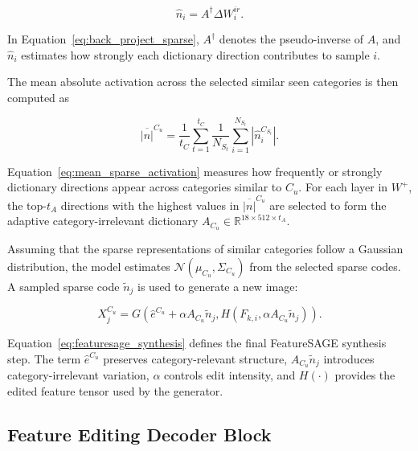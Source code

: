 \begin{equation}
    \hat{n}_i = A^{\dagger}\Delta W_i^{ir}.
    \label{eq:back_project_sparse}
\end{equation}

In Equation~\eqref{eq:back_project_sparse}, $A^{\dagger}$ denotes the pseudo-inverse of $A$, and $\hat{n}_i$ estimates how strongly each dictionary direction contributes to sample $i$.

The mean absolute activation across the selected similar seen categories is then computed as

\begin{equation}
    \overline{|n|}^{C_u} =
    \frac{1}{t_C}\sum_{t=1}^{t_C}
    \frac{1}{N_{S_t}}\sum_{i=1}^{N_{S_t}} |\hat{n}_i^{C_{S_t}}|.
    \label{eq:mean_sparse_activation}
\end{equation}

Equation~\eqref{eq:mean_sparse_activation} measures how frequently or strongly dictionary directions appear across categories similar to $C_u$. For each layer in $W^{+}$, the top-$t_A$ directions with the highest values in $\overline{|n|}^{C_u}$ are selected to form the adaptive category-irrelevant dictionary $A_{C_u} \in \mathbb{R}^{18 \times 512 \times t_A}$.

Assuming that the sparse representations of similar categories follow a Gaussian distribution, the model estimates $\mathcal{N}(\mu_{C_u}, \Sigma_{C_u})$ from the selected sparse codes. A sampled sparse code $\tilde{n}_j$ is used to generate a new image:

\begin{equation}
    X_j^{C_u} =
    G\left(\hat{e}^{C_u} + \alpha A_{C_u}\tilde{n}_j,
    H(F_{k,i}, \alpha A_{C_u}\tilde{n}_j)\right).
    \label{eq:featuresage_synthesis}
\end{equation}

Equation~\eqref{eq:featuresage_synthesis} defines the final FeatureSAGE synthesis step. The term $\hat{e}^{C_u}$ preserves category-relevant structure, $A_{C_u}\tilde{n}_j$ introduces category-irrelevant variation, $\alpha$ controls edit intensity, and $H(\cdot)$ provides the edited feature tensor used by the generator.

\subsection{Feature Editing Decoder Block}

